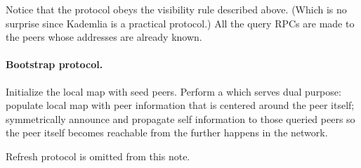 Notice that the protocol obeys the visibility rule described above.
(Which is no surprise since Kademlia is a practical protocol.)
All the query RPCs are made to the peers whose addresses are already known.

\paragraph{Bootstrap protocol.}
Initialize the local map with seed peers.
Perform a \find[self ID, $n$] which serves dual purpose: populate local map with peer information that is centered around the peer itself; symmetrically announce and propagate self information to those queried peers so the peer itself becomes reachable from the further \find happens in the network.

Refresh protocol is omitted from this note.